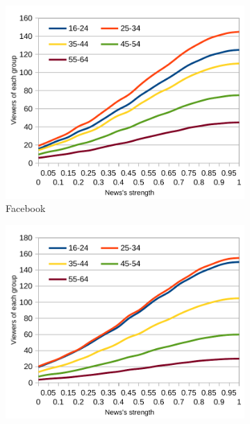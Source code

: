 \vspace*{-15pt}
\begin{figure}[!ht]
  \begin{subfigure}[l]{0.32\textwidth}
    \begin{center}
      \includegraphics[width=1\textwidth]{charts/second-test-fb_2.pdf}
    \end{center}
    \vspace*{-10pt}
    \caption{Facebook}
    \label{img:result_test_2_fb_2}
  \end{subfigure}  
  \begin{subfigure}[c]{0.32\textwidth}
    \begin{center}
      \includegraphics[width=1\textwidth]{charts/second-test-tw_2.pdf}

\end{center}
\end{subfigure}
\end{figure}
